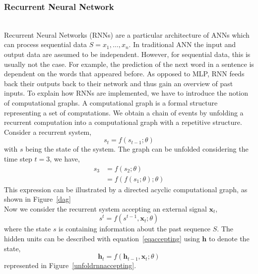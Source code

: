 
\subsubsection{Recurrent Neural Network}~\\


Recurrent Neural Networks (RNNs) are a particular architecture of ANNs which can
process sequential data $S = x_{1},\dots,x_{n}$. In traditional ANN the input
and output data are assumed to be independent. However, for sequential data,
this is usually not the case. For example, the prediction of the next word in a
sentence is dependent on the words that appeared before. As opposed to MLP, RNN
feeds back their outputs back to their network and thus gain an overview of past
inputs. To explain how RNNs are implemented, we have to introduce the notion of
computational graphs. A computational graph is a formal structure representing a
set of computations. We obtain a chain of events by unfolding a recurrent
computation into a computational graph with a repetitive structure. \\

Consider a recurrent system,
\begin{equation}
  s_{t} = f(s_{t-1};\theta)
\end{equation}
with $s$ being the state of the system. The graph can be unfolded considering
the time step $t = 3$, we have,
\begin{equation}
  \begin{split}
    s_{3} & = f(s_{2};\theta) \\
          & = f(f(s_{1};\theta);\theta)
  \end{split}
  \label{recurrentsystem}
\end{equation}
This expression can be illustrated by a directed acyclic computational graph, as
shown in Figure~\ref{dag}\\


Now we consider the recurrent system accepting an external signal $\bm{x}_{t}$,
\begin{equation}
  s^{t} = f(s^{t-1},\bm{x}_{t};\theta)
  \label{eqaccepting}
\end{equation}
where the state $s$ is containing information about the past sequence $S$. The
hidden units can be described with equation~\ref{eqaccepting} using $\bm{h}$ to
denote the state,
\begin{equation}
  \bm{h}_{t} = f(\bm{h}_{t-1},\bm{x}_{t};\theta)
\end{equation}
represented in Figure~\ref{unfoldrnnaccepting}.\\


